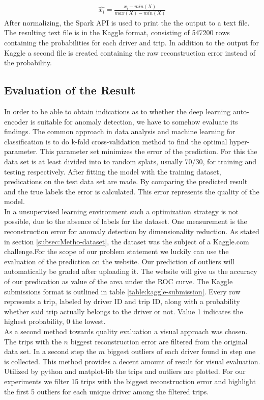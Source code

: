 \documentclass{vldb}
\begin{document}
\begin{align}
\hat{x_i} = \frac{x_i - min(X)}{max(X) - min(X)}
\end{align}
After normalizing, the Spark API is used to print the the output to a text file. The resulting text file is in the Kaggle format, consisting of 547200 rows containing the probabilities for each driver and trip. In addition to the output for Kaggle a second file is created containing the raw reconstruction error instead of the probability.


\subsection{Evaluation of the Result}
\label{subsec:eval-result}
In order to be able to obtain indications as to whether the deep learning auto-encoder is suitable for anomaly detection, we have to somehow evaluate its findings. The common approach in data analysis and machine learning for classification is to do k-fold cross-validation method to find the optimal hyper-parameter. This parameter set minimizes the error of the prediction. For this the data set is at least divided into to random splats, usually 70/30, for training and testing respectively. After fitting the model with the training dataset, predications on the test data set are made. By comparing the predicted result and the true labels the error is calculated. This error represents the quality of the model.\\
In a unsupervised learning environment such a optimization strategy is not possible, due to the absence of labels for the dataset. One measurement is the reconstruction error for anomaly detection by dimensionality reduction. As stated in section \ref{subsec:Metho-dataset}, the dataset was the subject of a Kaggle.com challenge.For the scope of our problem statement we luckily can use the evaluation of the prediction on the website.  Our prediction of outliers will automatically be graded after uploading it. The website will give us the accuracy of our predication as value of the area under the ROC curve. The Kaggle submissions format is outlined in table \ref{table:kaggle-submission}. Every row represents a trip, labeled by driver ID and trip ID, along with a probability whether said trip actually belongs to the driver or not. Value 1 indicates the highest probability, 0 the lowest. \\
As a second method towards quality evaluation a visual approach was chosen. The trips with the $n$ biggest reconstruction error are filtered from the original data set. In a second step the $m$ biggest outliers of each driver found in step one is collected. This method provides a decent amount of result for visual evaluation. Utilized by python and matplot-lib the trips and outliers are plotted. For our experiments we filter 15 trips with the biggest reconstruction error and highlight the first 5 outliers for each unique driver among the filtered trips. \\
 
\end{document}
